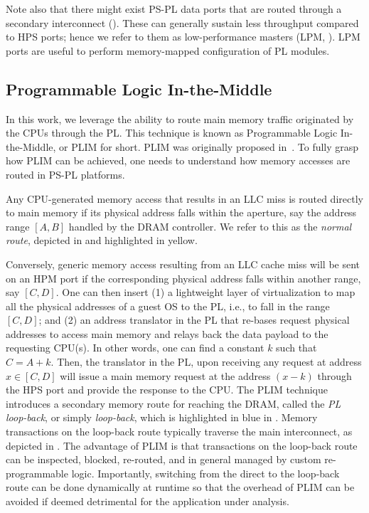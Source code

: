 Note also that there might exist PS-PL data ports that are routed
through a secondary interconnect
(). These can generally sustain less
throughput compared to HPS ports; hence we refer to them as
low-performance masters (LPM, ). LPM
ports are useful to perform memory-mapped configuration of PL modules.

\subsection{Programmable Logic In-the-Middle}\label{sec:bg_plim}
In this work, we leverage the ability to route main memory traffic
originated by the CPUs through the PL. This technique is known as
Programmable Logic In-the-Middle, or PLIM for short. PLIM was
originally proposed in~\cite{PLIM20}. To fully grasp how PLIM can be
achieved, one needs to understand how memory accesses are routed in PS-PL platforms.

 Any CPU-generated memory access
that results in an LLC miss is routed directly to main memory if its
physical address falls within the aperture, say the address range
$[A,B]$ handled by the DRAM controller. We refer to this as the
\emph{normal route}, depicted in  and
highlighted in yellow.

Conversely, generic memory access resulting from an LLC cache miss
will be sent on an HPM port if the corresponding physical address
falls within another range, say $[C,D]$. One can then insert (1) a
lightweight layer of virtualization to map all the physical addresses
of a guest OS to the PL, i.e., to fall in the range $[C,D]$; and (2) an
address translator in the PL that re-bases request physical addresses
to access main memory and relays back the data payload to the
requesting CPU(s). In other words, one can find a constant $k$ such
that $C = A + k$. Then, the translator in the PL, upon receiving any
request at address $x \in [C, D]$ will issue a main memory request at
the address $(x - k)$ through the HPS port and provide the response to
the CPU.  The PLIM technique introduces a secondary memory route for
reaching the DRAM, called the \emph{PL loop-back}, or simply
\emph{loop-back}, which is highlighted in blue in
. Memory transactions on the
loop-back route typically traverse the main interconnect, as depicted
in . The advantage of PLIM is that
transactions on the loop-back route can be inspected, blocked,
re-routed, and in general managed by custom re-programmable
logic. Importantly, switching from the direct to the loop-back route
can be done dynamically at runtime so that the overhead of PLIM can be
avoided if deemed detrimental for the application under analysis.

